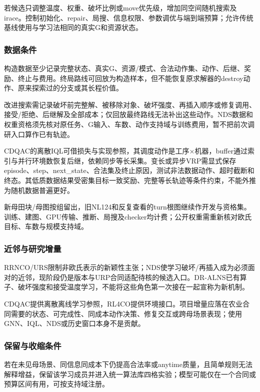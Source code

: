 \documentclass[11pt,a4paper]{article}
\newcommand{\bodytext}[1]{#1\par}
\begin{document}
\bodytext{若候选只调整温度、权重、破坏比例或move优先级，增加同空间随机搜索及irace。控制初始化、repair、局搜、信息权限、参数调优与端到端预算；允许传统基线使用与学习法相同的真实G和资源状态。}
\subsubsection{数据条件}
\bodytext{构造数据至少记录完整状态、真实G、资源/\allowbreak{}模式、合法动作集、动作、后继、奖励、终止与费用。终局路线可回放为构造样本，但不能恢复原求解器的destroy动作、原来探索过的分支或其长程价值。}
\bodytext{改进搜索需记录破坏前完整解、被移除对象、破坏强度、再插入顺序或修复调用、接受/\allowbreak{}拒绝、后继解及全部成本；仅回放最终路线无法补出这些动作。NDS数据和权重资格须先核对原任务、G输入、车数、动作支持域与训练费用，暂不把前次调研入口算作已有轨迹。}
\bodytext{CDQAC的离散IQL可借损失与实现参照，其调度动作是工序×机器，buffer通过索引与并行环境数恢复后继，依赖同步等长采集。变长或异步VRP需显式保存episode、step、next\_\allowbreak{}state、合法集及终止原因，测试非法数据动作、超时截断和终态。其低质数据结果受密集目标一致奖励、完整等长轨迹等条件约束，不能外推为随机数据普遍更好。}
\bodytext{新母田块/\allowbreak{}母图按组留出，旧NL124和反复查看的turn根图继续作开发与资格集。训练、建图、GPU传输、推断、局搜及checker均计费；公开权重需重新核对欧氏目标、车数与规模支持域。}
\subsubsection{近邻与研究增量}
\bodytext{RRNCO/\allowbreak{}URS限制非欧氏表示的新颖性主张；NDS使学习破坏/\allowbreak{}再插入成为必须面对的近邻，现阶段仍是版本与URP合同适配待核的候选入口。DR-ALNS已有算子、破坏强度和接受温度学习，不能将这些角色第一次接在一起宣称为新机制。}
\bodytext{CDQAC提供离散离线学习参照，RL4CO提供环境接口。项目增量应落在农业合同需要的状态、可完成性、同成本动作决策、修复交互或跨母场景表现；使用GNN、IQL、NDS或历史窗口本身不是贡献。}
\subsubsection{保留与收缩条件}
\bodytext{若在未见母场景、同信息同成本下仍提高合法率或anytime质量，且简单规则无法解释增益，保留该学习成员并进入统一算法库四格实验；模型可能仅在一个合同或预算区间有用，可按支持域注册。}
\end{document}
